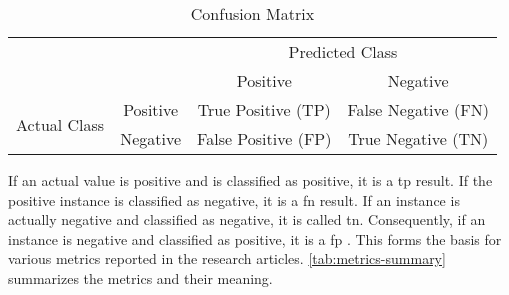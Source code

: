 \begin{table}[ht]
    \captionsetup{justification=raggedright,singlelinecheck=false}
    \caption{Confusion Matrix}
    \label{tab:confusion-matrix}
    \renewcommand{\arraystretch}{1.25}
    \centering
        \begin{tabular}{cc|c|c|}
            \cline{3-4}
            & & \multicolumn{2}{c|}{Predicted Class} \\ \cline{3-4} 
            & & Positive & Negative \\ \hline
            \multicolumn{1}{|c|}{\multirow{2}{*}{Actual Class}} & Positive & True Positive (TP) & False Negative (FN) \\ \cline{2-4} 
            \multicolumn{1}{|c|}{} & Negative & False Positive (FP) & True Negative (TN) \\ \hline
        \end{tabular}
\end{table}

\noindent If an actual value is positive and is classified as positive, it is a \gls{tp} result. If the positive instance is classified as negative, it is a \gls{fn} result. If an instance is actually negative and classified as negative, it is called \gls{tn}. Consequently, if an instance is negative and classified as positive, it is a \gls{fp} \cite{Fawcett2006}. This forms the basis for various metrics reported in the research articles. \autoref{tab:metrics-summary} summarizes the metrics and their meaning.

